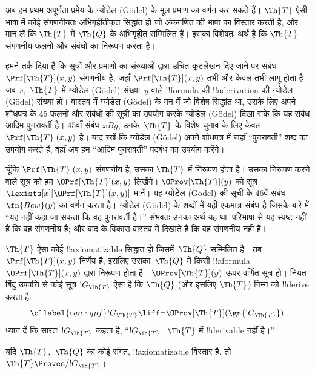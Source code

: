 \documentclass[../../../include/open-logic-section]{subfiles}
\begin{document}


अब हम प्रथम अपूर्णता-प्रमेय के ग्योडेल (G\"odel) के मूल प्रमाण का वर्णन
कर सकते हैं। $\Th{T}$ ऐसी भाषा में कोई संगणनीयतः अभिगृहीतीकृत सिद्धांत
हो जो अंकगणित की भाषा का विस्तार करती है, और मान लें कि $\Th{T}$ में
$\Th{Q}$ के अभिगृहीत सम्मिलित हैं। इसका विशेषतः अर्थ है कि $\Th{T}$
संगणनीय फलनों और संबंधों का निरूपण करता है।

हमने तर्क दिया है कि सूत्रों और प्रमाणों का संख्याओं द्वारा उचित कूटलेखन
दिए जाने पर संबंध $\Prf[\Th{T}](x,y)$ संगणनीय है, जहाँ
$\Prf[\Th{T}](x,y)$ तभी और केवल तभी लागू होता है जब $x$,~$\Th{T}$ में
ग्योडेल (G\"odel) संख्या~$y$ वाले !!{formula} की !!a{derivation} की ग्योडेल (G\"odel) संख्या
हो। वास्तव में ग्योडेल (G\"odel) के मन में जो विशेष सिद्धांत था, उसके लिए अपने
शोधपत्र के 45 फलनों और संबंधों की सूची का उपयोग करके ग्योडेल (G\"odel) दिखा सके कि यह
संबंध आदिम पुनरावर्ती है। 45वाँ संबंध $x B y$, उनके~$\Th{T}$ के विशेष
चुनाव के लिए केवल $\Prf[\Th{T}](x,y)$ है। याद रखें कि ग्योडेल (G\"odel) अपने शोधपत्र
में जहाँ ``पुनरावर्ती'' शब्द का उपयोग करते हैं, वहाँ अब हम ``आदिम
पुनरावर्ती'' पदबंध का उपयोग करेंगे।

चूँकि $\Prf[\Th{T}](x,y)$ संगणनीय है, उसका $\Th{T}$ में निरूपण होता है।
उसका निरूपण करने वाले सूत्र को हम $\OPrf[\Th{T}](x,y)$ लिखेंगे।
$\OProv[\Th{T}](y)$ को सूत्र
$\lexists[x][\OPrf[\Th{T}](x,y)]$ मानें। यह ग्योडेल (G\"odel) की सूची के 46वें
संबंध $\fn{Bew}(y)$ का वर्णन करता है। ग्योडेल (G\"odel) के शब्दों में यही एकमात्र
संबंध है जिसके बारे में ``यह नहीं कहा जा सकता कि वह पुनरावर्ती है।'' संभवतः
उनका अर्थ यह था: परिभाषा से यह स्पष्ट नहीं है कि वह संगणनीय है; और बाद के
विकास वास्तव में दिखाते हैं कि वह संगणनीय नहीं है।

$\Th{T}$ ऐसा कोई !!{axiomatizable} सिद्धांत हो जिसमें~$\Th{Q}$ सम्मिलित
है। तब $\Prf[\Th{T}](x, y)$ निर्णेय है, इसलिए उसका~$\Th{Q}$ में किसी
!!a{formula}~$\OPrf[\Th{T}](x, y)$ द्वारा निरूपण होता है।
$\OProv[\Th{T}](y)$ ऊपर वर्णित सूत्र हो। नियत-बिंदु उपपत्ति से कोई सूत्र
$!G_\Th{T}$ ऐसा है कि $\Th{Q}$ (और इसलिए $\Th{T}$) निम्न को !!{derive}
करता है:
\begin{equation}
\ollabel{eqn:qpf}
!G_\Th{T} \liff \lnot \OProv[\Th{T}](\gn{!G_\Th{T}}).
\end{equation}
ध्यान दें कि सारतः $!G_\Th{T}$ कहता है, ``$!G_\Th{T}$,~$\Th{T}$ में
!!{derivable} नहीं है।''

\begin{lem}
यदि $\Th{T}$,~$\Th{Q}$ का कोई संगत, !!{axiomatizable} विस्तार है, तो
$\Th{T} \Proves/ !G_\Th{T}$।
\end{lem}
\end{document}

